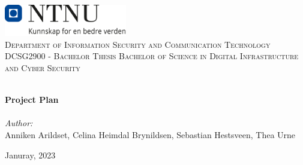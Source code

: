 \begin{titlepage}
\vbox{ }
\vbox{ }
\begin{center}
\includegraphics[width=0.40\textwidth]{Images/NTNU_logo.png}\\[1cm]
\textsc{\LARGE Department of Information Security and Communication Technology}\\[1.5cm]
\textsc{\Large DCSG2900 -  Bachelor Thesis Bachelor of Science in Digital Infrastructure and Cyber Security}\\[0.5cm]
\vbox{ }

\HRule \\[0.4cm]
{ \huge \bfseries Project Plan}\\[0.4cm]
\HRule \\[1.5cm]

\large
\emph{Author:}\\
Anniken Arildset, Celina Heimdal Brynildsen, Sebastian Hestsveen, Thea Urne
\vfill

{\large Januray, 2023}
\end{center}
\end{titlepage}